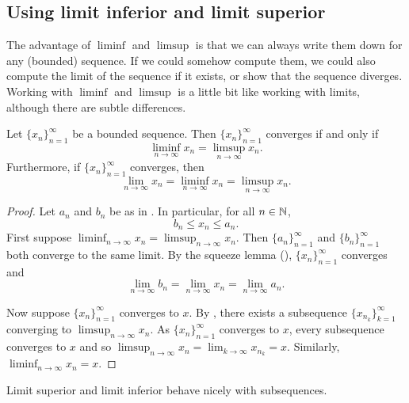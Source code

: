 \subsection{Using limit inferior and limit superior}

The advantage of $\liminf$ and $\limsup$ is that we can always write them
down for any (bounded) sequence.
If we could somehow compute them, we could also compute the limit of the
sequence if it exists, or show that the sequence diverges.
Working with $\liminf$ and $\limsup$ is a
little bit like working with limits, although there are subtle differences.

\begin{prop} \label{liminfsupconv:prop}
Let $\{ x_n \}_{n=1}^\infty$ be a bounded sequence.  Then
$\{ x_n \}_{n=1}^\infty$ converges
if and only if
\begin{equation*}
\liminf_{n\to \infty} x_n = 
\limsup_{n\to \infty} x_n.
\end{equation*}
Furthermore, if $\{ x_n \}_{n=1}^\infty$ converges, then
\begin{equation*}
\lim_{n\to \infty} x_n = 
\liminf_{n\to \infty} x_n = 
\limsup_{n\to \infty} x_n.
\end{equation*}
\end{prop}

\begin{proof}
Let $a_n$ and $b_n$ be as in .
In particular, for all $n \in {\mathbb{N}}$,
\begin{equation*}
b_n \leq x_n \leq a_n .
\end{equation*}
First suppose
$\liminf_{n\to\infty} x_n = \limsup_{n\to\infty} x_n$.
Then $\{ a_n \}_{n=1}^\infty$ and $\{ b_n \}_{n=1}^\infty$
both converge to the same limit.
By the squeeze lemma
(), $\{ x_n \}_{n=1}^\infty$ converges and
\begin{equation*}
\lim_{n\to \infty} b_n
=
\lim_{n\to \infty} x_n
=
\lim_{n\to \infty} a_n .
\end{equation*}

Now suppose $\{ x_n \}_{n=1}^\infty$ converges to $x$.
By ,
there exists a subsequence $\{ x_{n_k} \}_{k=1}^\infty$
converging to $\limsup_{n\to\infty} x_n$.
As $\{ x_n \}_{n=1}^\infty$ converges to $x$,
every subsequence converges to $x$ and
so $\limsup_{n\to\infty} x_n = \lim_{k\to\infty} x_{n_k} = x$.
Similarly, $\liminf_{n\to\infty} x_n = x$.
\end{proof}

Limit superior and limit inferior behave nicely
with subsequences.

